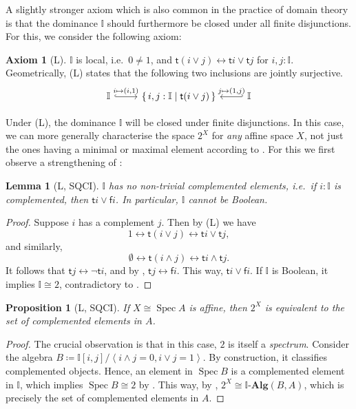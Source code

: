 \documentclass[12pt]{amsart}
\newtheorem{lemma}[theorem]{Lemma}
\newtheorem{proposition}[theorem]{Proposition}
\theoremstyle{definition}
\newtheorem*{axiom}{Axiom}
\newcommand{\mb}[1]{\mathbf{#1}}
\newcommand{\mbb}[1]{\mathbb{#1}}
\newcommand{\I}{\mbb I}
\newcommand{\ms}[1]{\mathsf{#1}}
\newcommand{\alg}{\text{-}\mb{Alg}}
\newcommand{\pair}[1]{\left\langle#1\right\rangle}
\newcommand{\scomp}[2]{\{\,#1\mid#2\,\}}
\newcommand{\emp}{\emptyset}
\newcommand{\eq}{\leftrightarrow}
\newcommand{\spec}{\operatorname{Spec}}
\begin{document}
A slightly stronger axiom which is also common in the practice of domain theory is that the dominance $\I$ should furthermore be closed under all finite disjunctions. For this, we consider the following axiom:

\begin{axiom}[L]\label{ax:L}
  $\I$ is local, i.e.\ $0 \neq 1$, and $\ms t(i\vee j) \eq \ms ti \vee \ms tj$ for $i,j : \I$. Geometrically, (L) states that the following two inclusions are jointly surjective.
  \[ 
  \begin{tikzcd}
    \I \ar[r, hook, "{i \mapsto (i,1)}"] & \scomp{i,j : \I}{\ms t(i\vee j)} & \I \ar[l, hook', "{j \mapsto (1,j)}"']
  \end{tikzcd}
  \]
\end{axiom}

Under (L), the dominance $\I$ will be closed under finite disjunctions. In this case, we can more generally characterise the space $2^X$ for \emph{any} affine space $X$, not just the ones having a minimal or maximal element according to . For this we first observe a strengthening of :

\begin{lemma}[L, SQCI]\label{lem:intisnotBoolean}
  $\I$ has no non-trivial complemented elements, i.e.\ if $i : \I$ is complemented, then $\ms ti \vee \ms fi$. In particular, $\I$ cannot be Boolean.
\end{lemma}
\begin{proof}
  Suppose $i$ has a complement $j$. Then by (L) we have
  \[ 1 \eq \ms t(i \vee j) \eq \ms ti \vee \ms tj, \]
  and similarly,
  \[ \emp \eq \ms t(i \wedge j) \eq \ms ti \wedge \ms tj. \]
  It follows that $\ms tj \eq \neg \ms ti$, and by , $\ms tj \eq \ms fi$. This way, $\ms ti \vee \ms fi$. If $\I$ is Boolean, it implies $\I \cong 2$, contradictory to .
\end{proof}

\begin{proposition}[L, SQCI]\label{prop:complementinalgebra}
  If $X \cong \spec A$ is affine, then $2^X$ is equivalent to the set of complemented elements in $A$.
\end{proposition}
\begin{proof}
  The crucial observation is that in this case, $2$ is itself a \emph{spectrum}. Consider the algebra $B \coloneq \I[i,j]/\pair{i\wedge j =0,i\vee j = 1}$. By construction, it classifies complemented objects. Hence, an element in $\spec B$ is a complemented element in $\I$, which implies $\spec B \cong 2$ by . This way, by , $2^X \cong \I\alg(B,A)$, which is precisely the set of complemented elements in $A$.
\end{proof}
\end{document}
